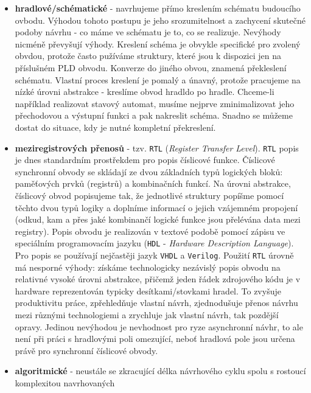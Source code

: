       \begin{itemize}
        \item \textbf{hradlové/schématické} - navrhujeme přímo kreslením schématu budoucího ovbodu. Výhodou tohoto postupu je jeho
          srozumitelnost a zachycení skuteč\-né podoby návrhu  - co máme ve schématu je to, co se realizuje. Nevýhody nicméně
          převyšují výhody. Kreslení schéma je obvykle specifické pro zvolený obvdou, protože často pužíváme struktury, které jsou
          k dispozici jen na příslušném PLD obvodu. Konverze do jiného obvou, znamená překleslení schématu. Vlastní proces
          kreslení je pomalý a únavný, protože pracujeme na nízké úrovni abstrakce - kreslíme obvod hradldo po hradle. Chceme-li
          například realizovat stavový automat, musíme nejprve zminimalizovat jeho přechodovou a výstupní funkci a pak nakreslit
          schéma. Snadno se můžeme dostat do situace, kdy je nutné kompletní překreslení. 
        \item \textbf{meziregistrových přenosů} - tzv. \texttt{RTL} (\emph{Register Transfer Level}). \texttt{RTL} popis je dnes
          standardním prostřekdem pro popis číslicové funkce. Číslicové synchronní obvody se skládají ze dvou základních typů
          logických bloků: pamě\-ťo\-vých prvků (registrů) a kombinačních funkcí. Na úrovni abstrakce, číslicový obvod popisujeme
          tak, že jednotlivé struktury popíšme pomocí těchto dvou typů logiky a doplníme informací o jejich vzájemném propojení
          (odkud, kam a přes jaké kombinančí logické funkce jsou přelévána data mezi registry). Popis obvodu je realizován v
          textové podobě pomocí zápisu ve speciálním progra\-mo\-va\-cím jazyku (\texttt{HDL} - \emph{Hardware Description
          Language}). Pro popis se používají nejčastěji jazyk \texttt{VHDL} a \texttt{Verilog}. Použití \texttt{RTL} úrovně má
          nesporné výhody: získáme technologicky nezávislý popis obvodu na relativné vysoké úrovni abstrakce, přičemž jeden řádek
          zdrojového kódu je v hardware reprezentován typicky desítkami/stovkami hradel. To zvyšuje produktivitu práce,
          zpřehledňuje vlastní návrh, zjednodušuje přenos návrhu mezi různými technologiemi a zrychluje jak vlastní návrh, tak
          pozdější opravy. Jedinou nevý\-ho\-dou je nevhodnost pro ryze asynchronní návhr, to ale není při práci s
          hrad\-lo\-vý\-mi poli omezující, neboť hradlová pole jsou určena právě pro synchronní číslicové obvody.
        \item \textbf{algoritmické} - neustále se zkracující délka návrhového cyklu spolu s rostoucí komplexitou navrhovaných

\end{itemize}
